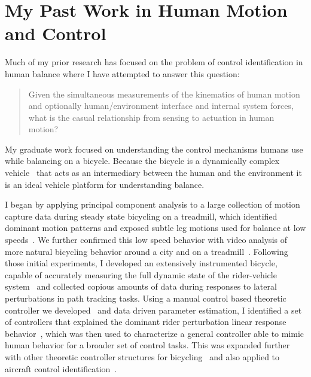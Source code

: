 \documentclass{article}
\begin{document}
\section*{My Past Work in Human Motion and Control}
%
Much of my prior research has focused on the problem of control identification
in human balance where I have attempted to answer this question:

\begin{quote}
  Given the simultaneous measurements of the kinematics of human motion and
  optionally human/environment interface and internal system forces, what is
  the casual relationship from sensing to actuation in human motion?
\end{quote}

My graduate work focused on understanding the control mechanisms humans use
while balancing on a bicycle. Because the bicycle is a dynamically complex
vehicle~\cite{Astrom2005,Meijaard2007,Moore2007,Moore2008} that acts as an
intermediary between the human and the environment it is an ideal vehicle
platform for understanding balance.

I began by applying principal component analysis to a large collection of
motion capture data during steady state bicycling on a treadmill, which
identified dominant motion patterns and exposed subtle leg motions used for
balance at low speeds~\cite{Moore2009a,Moore2011c}. We further confirmed this
low speed behavior with video analysis of more natural bicycling behavior
around a city and on a treadmill~\cite{Kooijman2009}. Following those initial
experiments, I developed an extensively instrumented bicycle, capable of
accurately measuring the full dynamic state of the rider-vehicle
system~\cite{Moore2012,Moore2013} and collected copious amounts of data during
responses to lateral perturbations in path tracking tasks. Using a manual
control based theoretic controller we developed~\cite{Hess2012} and data driven
parameter estimation, I identified a set of controllers that explained the
dominant rider perturbation linear response behavior~\cite{Moore2012}, which
was then used to characterize a general controller able to mimic human behavior
for a broader set of control tasks. This was expanded further with other
theoretic controller structures for
bicycling~\cite{Schwab2012a,Schwab2012,Schwab2013} and also applied to aircraft
control identification~\cite{Hess2013}.
\end{document}

